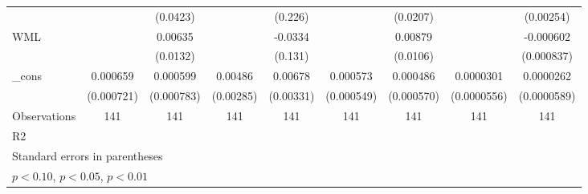 \begin{table}[htbp]
\begin{tabular}{l*{8}{c}}
                    &                     &    (0.0423)         &                     &     (0.226)         &                     &    (0.0207)         &                     &   (0.00254)         \\
WML                 &                     &     0.00635         &                     &     -0.0334         &                     &     0.00879         &                     &   -0.000602         \\
                    &                     &    (0.0132)         &                     &     (0.131)         &                     &    (0.0106)         &                     &  (0.000837)         \\
\_cons              &    0.000659         &    0.000599         &     0.00486\sym{*}  &     0.00678\sym{**} &    0.000573         &    0.000486         &   0.0000301         &   0.0000262         \\
                    &  (0.000721)         &  (0.000783)         &   (0.00285)         &   (0.00331)         &  (0.000549)         &  (0.000570)         & (0.0000556)         & (0.0000589)         \\
\hline
Observations        &         141         &         141         &         141         &         141         &         141         &         141         &         141         &         141         \\
R2                  &                     &                     &                     &                     &                     &                     &                     &                     \\
\hline\hline
\multicolumn{9}{l}{\footnotesize Standard errors in parentheses}\\
\multicolumn{9}{l}{\footnotesize \sym{*} \(p<0.10\), \sym{**} \(p<0.05\), \sym{***} \(p<0.01\)}\\
\end{tabular}
\end{table}
